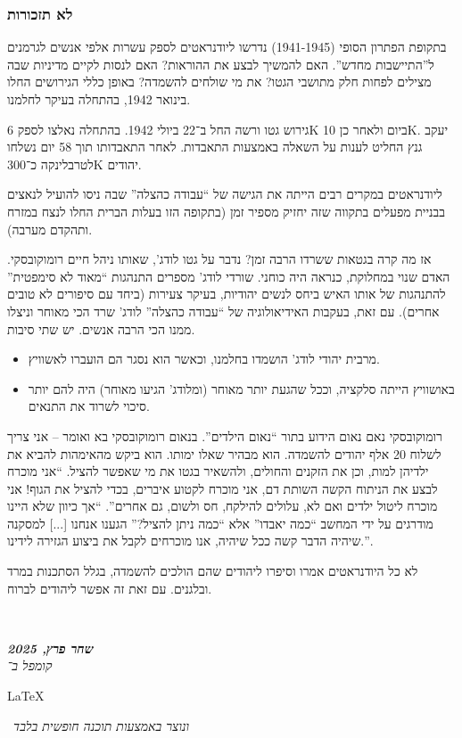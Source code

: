\documentclass[]{article}
\newcommand\en[1] {\begin{otherlanguage}{english}#1\end{otherlanguage}}
\newcommand\ndoc  {\dotfill \\ \vfil {\begin{center}
			{\textbf{\textit{שחר פרץ, 2025}} \\
				\scriptsize \textit{קומפל ב־}\en{\LaTeX}\,\textit{ ונוצר באמצעות תוכנה חופשית בלבד}}
	\end{center}} \vfil	}
\begin{document}
	\subsubsection*{לא תזכורות}
	בתקופת הפתרון הסופי (1941-1945) נדרשו ליודנראטים לספק עשרות אלפי אנשים לגרמנים ל''התיישבות מחדש''. האם להמשיך לבצע את ההוראות? האם לנסות לקיים מדיניות שבה מצילים לפחות חלק מתושבי הגטו? את מי שולחים להשמדה? באופן כללי הגירושים החלו בינואר 1942, בהתחלה בעיקר לחלמנו. 
	
	גירוש גטו ורשה החל ב־22 ביולי 1942. בהתחלה נאלצו לספק 6K ביום ולאחר כן 10K. 
	יעקב גנץ החליט לענות על השאלה באמצעות התאבדות. לאחר התאבדותו תוך 58 יום נשלחו לטרבלינקה כ־300K יהודים. 
	
	ליודנראטים במקרים רבים הייתה את הגישה של ``עבודה כהצלה'' שבה ניסו להועיל לנאצים בבניית מפעלים בתקווה שזה יחזיק מספיר זמן (בתקופה הזו בעלות הברית החלו לנצח במזרח ותהקדם מערבה). 
	
	אז מה קרה בגטאות ששרדו הרבה זמן? נדבר על גטו לודג', שאותו ניהל חיים רומוקובסקי. האדם שנוי במחלוקת, כנראה היה כוחני. שורדי לודג' מספרים התנהגות ``מאוד לא סימפטית'' להתנהגות של אותו האיש ביחס לנשים יהודיות, בעיקר צעירות (ביחד עם סיפורים לא טובים אחרים). עם זאת, בעקבות האידיאולוגיה של ``עבודה כהצלה'' לודג' שרד הכי מאוחר וניצלו ממנו הכי הרבה אנשים. יש שתי סיבות. 
	\begin{itemize}
		\item מרבית יהודי לודג' הושמדו בחלמנו, וכאשר הוא נסגר הם הועברו לאשוויץ. 
		\item באושוויץ הייתה סלקציה, וככל שהגעת יותר מאוחר (ומלודג' הגיעו מאוחר) היה להם יותר סיכוי לשרוד את התנאים. 
	\end{itemize}
	רומוקובסקי נאם נאום הידוע בתור ``נאום הילדים''. בנאום רומוקובסקי בא ואומר – אני צריך לשלוח 20 אלף יהודים להשמדה. הוא מבהיר שאלו ימותו. הוא ביקש מהאימהות להביא את ילדיהן למות, וכן את הזקנים והחולים, ולהשאיר בגטו את מי שאפשר להציל. ``אני מוכרח לבצע את הניתוח הקשה השותת דם, אני מוכרח לקטוע איברים, בכדי להציל את הגוף! אני מוכרח ליטול ילדים ואם לא, עלולים להילקח, חס ולשום, גם אחרים''. ``אך כיוון שלא היינו מודרגים על ידי המחשב ``כמה יאבדו'' אלא ``כמה ניתן להציל?'' הגענו אנחנו [...] למסקנה שיהיה הדבר קשה ככל שיהיה, אנו מוכרחים לקבל את ביצוע הגזירה לידינו.''. 
	
	לא כל היודנראטים אמרו וסיפרו ליהודים שהם הולכים להשמדה, בגלל הסתכנות במרד ובלגנים. עם זאת זה אפשר ליהודים לברוח. 
	
	
	
	
	
	
	\ndoc
\end{document}
